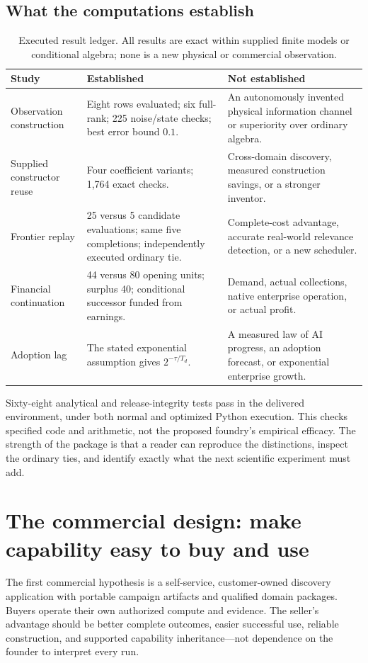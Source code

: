 \documentclass[11pt,letterpaper]{article}
\theoremstyle{remark}\newtheorem{remark}{Remark}[section]
\begin{document}
\subsection{What the computations establish}
\begin{table}[htbp]
\caption{Executed result ledger. All results are exact within supplied finite models or conditional algebra; none is a new physical or commercial observation.}
\label{tab:results}
\begin{tabularx}{\linewidth}{P{3.2cm}YY}
\toprule
\textbf{Study}&\textbf{Established}&\textbf{Not established}\\\midrule
Observation construction&Eight rows evaluated; six full-rank; 225 noise/state checks; best error bound $0.1$.&An autonomously invented physical information channel or superiority over ordinary algebra.\\
Supplied constructor reuse&Four coefficient variants; 1,764 exact checks.&Cross-domain discovery, measured construction savings, or a stronger inventor.\\
Frontier replay&25 versus 5 candidate evaluations; same five completions; independently executed ordinary tie.&Complete-cost advantage, accurate real-world relevance detection, or a new scheduler.\\
Financial continuation&44 versus 80 opening units; surplus 40; conditional successor funded from earnings.&Demand, actual collections, native enterprise operation, or actual profit.\\
Adoption lag&The stated exponential assumption gives $2^{-\tau/T_d}$.&A measured law of AI progress, an adoption forecast, or exponential enterprise growth.\\\bottomrule
\end{tabularx}
\end{table}

Sixty-eight analytical and release-integrity tests pass in the delivered environment, under both normal and optimized Python execution. This checks specified code and arithmetic, not the proposed foundry's empirical efficacy. The strength of the package is that a reader can reproduce the distinctions, inspect the ordinary ties, and identify exactly what the next scientific experiment must add.

\section{The commercial design: make capability easy to buy and use}
\label{sec:commerce}
The first commercial hypothesis is a self-service, customer-owned discovery application with portable campaign artifacts and qualified domain packages. Buyers operate their own authorized compute and evidence. The seller's advantage should be better complete outcomes, easier successful use, reliable construction, and supported capability inheritance---not dependence on the founder to interpret every run.
\end{document}
